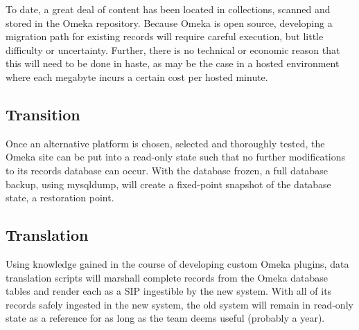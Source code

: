 To date, a great deal of content has been located in collections, scanned and stored in the Omeka repository. Because Omeka is open source, developing a migration path for existing records will require careful execution, but little difficulty or uncertainty. Further, there is no technical or economic reason that this will need to be done in haste, as may be the case in a hosted environment where each megabyte incurs a certain cost per hosted minute. 
\subsection{Transition}
Once an alternative platform is chosen, selected and thoroughly tested, the Omeka site can be put into a read-only state such that no further modifications to its records database can occur. With the database frozen, a full database backup, using mysqldump, will create a fixed-point snapshot of the database state, a restoration point.
\subsection{Translation}
Using knowledge gained in the course of developing custom Omeka plugins, data translation scripts will marshall complete records from the Omeka database tables and render each as a SIP ingestible by the new system. With all of its records safely ingested in the new system, the old system will remain in read-only state as a reference for as long as the team deems useful (probably a year).